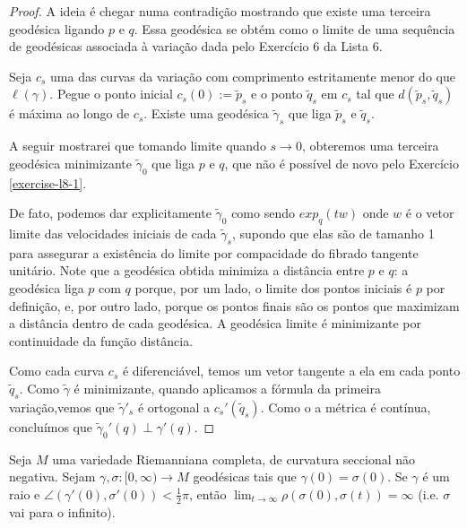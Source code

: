\documentclass{book}
\begin{document}
\begin{proof}
A ideia é chegar numa contradição mostrando
que existe uma terceira geodésica
ligando $p$ e $q$. Essa geodésica se obtém
como o limite de uma sequência de
geodésicas associada à variação dada pelo
Exercício 6 da Lista 6.

Seja $c_s$ uma das curvas da variação com
comprimento estritamente
menor do que $\ell(\gamma)$. Pegue o ponto
inicial $c_s(0):=\tilde{p}_s$ e o
ponto $\tilde{q}_s$ em $c_s$ tal que
$d(\tilde{p}_s,\tilde{q}_s)$ é máxima ao
longo de $c_s$. Existe uma geodésica
$\tilde{\gamma}_s$ que liga
$\tilde{p}_s$ e $\tilde{q}_s$.

A seguir mostrarei que tomando limite quando
$s \to 0$, obteremos uma terceira
geodésica minimizante $\tilde{\gamma}_0$ que
liga $p$ e $q$, que não é possível
de novo pelo Exercício \ref{exercise-l8-1}.

De fato, podemos dar explicitamente
$\tilde{\gamma}_0$ como sendo $exp_q(tw)$
onde $w$ é o vetor limite das velocidades
iniciais de cada $\tilde{\gamma}_s$,
supondo que elas são de tamanho 1 para
assegurar a existência do limite por
compacidade do fibrado tangente unitário.
Note que a geodésica obtida minimiza a
distância entre $p$ e $q$: a geodésica liga
$p$ com  $q$ porque, por um lado, o
limite dos pontos iniciais é $p$ por
definição, e, por outro lado, porque os
pontos finais são os pontos que maximizam a
distância dentro de cada geodésica.
A geodésica limite é minimizante por
continuidade da função distância.

Como cada curva $c_s$ é diferenciável, temos
um vetor tangente a ela em cada
ponto $\tilde{q}_s$. Como $\tilde{\gamma}$ é
minimizante, quando aplicamos a
fórmula da primeira variação,vemos que
$\tilde{\gamma}'_s$ é ortogonal a
$c_s'(\tilde{q}_s)$. Como o a métrica é
contínua, concluímos que
$\tilde{\gamma}_0'(q) \perp \gamma'(q)$.
\end{proof}

\begin{exercise}
\label{exercise-l8-11}
Seja $M$ uma variedade Riemanniana completa,
de curvatura seccional não
negativa. Sejam $\gamma,\sigma:[0,\infty) \to
M$ geodésicas tais que
$\gamma(0)=\sigma(0)$. Se $\gamma$ é um raio
e
$\angle(\gamma'(0),\sigma'(0))<\frac{1}{2}
\pi$,
então $\lim_{t \to \infty}
\rho(\sigma(0),\sigma(t))=\infty$ (i.e.
$\sigma$ vai para o infinito).
\end{exercise}
\end{document}
